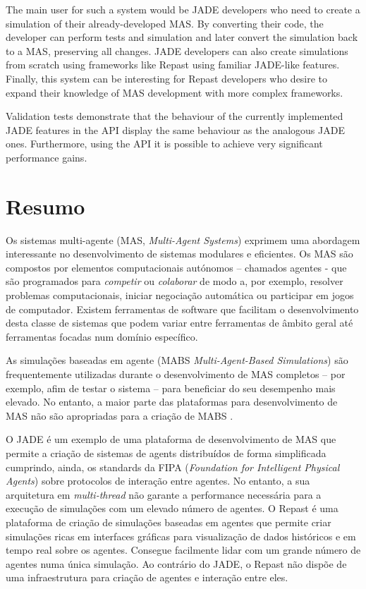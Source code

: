 The main user for such a system would be JADE developers who need to create a simulation of their already-developed MAS. By converting their code, the developer can perform tests and simulation and later convert the simulation back to a MAS, preserving all changes. JADE developers can also create simulations from scratch using frameworks like Repast using familiar JADE-like features. Finally, this system can be interesting for Repast developers who desire to expand their knowledge of MAS development with more complex frameworks.

Validation tests demonstrate that the behaviour of the currently implemented JADE features in the API display the same behaviour as the analogous JADE ones. Furthermore, using the API it is possible to achieve very significant performance gains.

\chapter*{Resumo}

Os sistemas multi-agente (MAS, \emph{Multi-Agent Systems}) exprimem uma abordagem interessante no desenvolvimento de sistemas modulares e eficientes. Os MAS são compostos por elementos computacionais autónomos -- chamados agentes - que são programados para \emph{competir} ou \emph{colaborar} de modo a, por exemplo, resolver problemas computacionais, iniciar negociação automática ou participar em jogos de computador. Existem ferramentas de software que facilitam o desenvolvimento desta classe de sistemas que podem variar entre ferramentas de âmbito geral até ferramentas focadas num domínio específico.

As simulações baseadas em agente (MABS \emph{Multi-Agent-Based Simulations}) são frequentemente utilizadas durante o desenvolvimento de MAS completos -- por exemplo, afim de testar o sistema -- para beneficiar do seu desempenho mais elevado. No entanto, a maior parte das plataformas para desenvolvimento de MAS não são apropriadas para a criação de MABS \cite{mengistu2008scalability}.

O JADE \cite{bellifemine2007developing} é um exemplo de uma plataforma de desenvolvimento de MAS que permite a criação de sistemas de agents distribuídos de forma simplificada cumprindo, ainda, os standards da FIPA (\emph{Foundation for Intelligent Physical Agents}) sobre protocolos de interação entre agentes. No entanto, a sua arquitetura em \emph{multi-thread} não garante a performance necessária para a execução de simulações com um elevado número de agentes. O Repast \cite{collier2003repast} é uma plataforma de criação de simulações baseadas em agentes que permite criar simulações ricas em interfaces gráficas para visualização de dados históricos e em tempo real sobre os agentes. Consegue facilmente lidar com um grande número de agentes numa única simulação. Ao contrário do JADE, o Repast não dispõe de uma infraestrutura para criação de agentes e interação entre eles.

